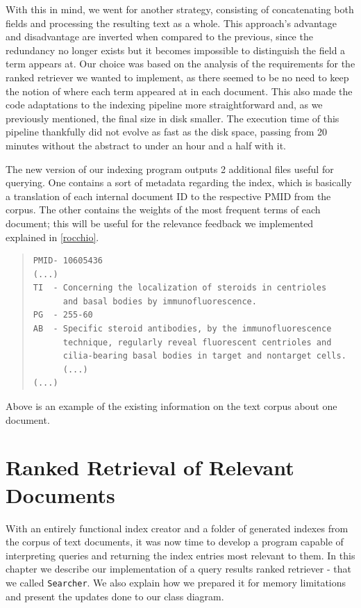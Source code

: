\documentclass[12pt]{article}
\begin{document}
With this in mind, we went for another strategy, consisting of concatenating 
both fields and processing the resulting text as a whole.
This approach's advantage and disadvantage are inverted when compared to the 
previous, since the redundancy no longer exists but it becomes impossible to
distinguish the field a term appears at.
Our choice was based on the analysis of the requirements for the ranked retriever
we wanted to implement, as there seemed to be no need to keep the notion of where
each term appeared at in each document.
This also made the code adaptations to the indexing pipeline more straightforward 
and, as we previously mentioned, the final size in disk smaller.
The execution time of this pipeline thankfully did not evolve as fast as the
disk space, passing from 20 minutes without the abstract to under an hour and a 
half with it.

The new version of our indexing program outputs 2 additional files useful for 
querying.
One contains a sort of metadata regarding the index, which is basically a 
translation of each internal document ID to the respective PMID from the corpus.
The other contains the weights of the most frequent terms of each document; this
will be useful for the relevance feedback we implemented explained in \ref{rocchio}.

\begingroup
\addtolength\leftmargini{-0.4in}
\addtolength\baselineskip{-0.05in}
\begin{quote}
\begin{verbatim}
PMID- 10605436
(...)
TI  - Concerning the localization of steroids in centrioles
      and basal bodies by immunofluorescence.
PG  - 255-60
AB  - Specific steroid antibodies, by the immunofluorescence 
      technique, regularly reveal fluorescent centrioles and 
      cilia-bearing basal bodies in target and nontarget cells. 
      (...)
(...)
\end{verbatim}
\end{quote}
\endgroup
\vspace{-10pt}
Above is an example of the existing information on the text corpus about one document.

\newpage
\section{Ranked Retrieval of Relevant Documents}

With an entirely functional index creator and a folder of generated indexes from
the corpus of text documents, it was now time to develop a program capable of
interpreting queries and returning the index entries most relevant to them.
In this chapter we describe our implementation of a query results ranked retriever
- that we called \texttt{Searcher}.
We also explain how we prepared it for memory limitations and present the 
updates done to our class diagram.
\end{document}
